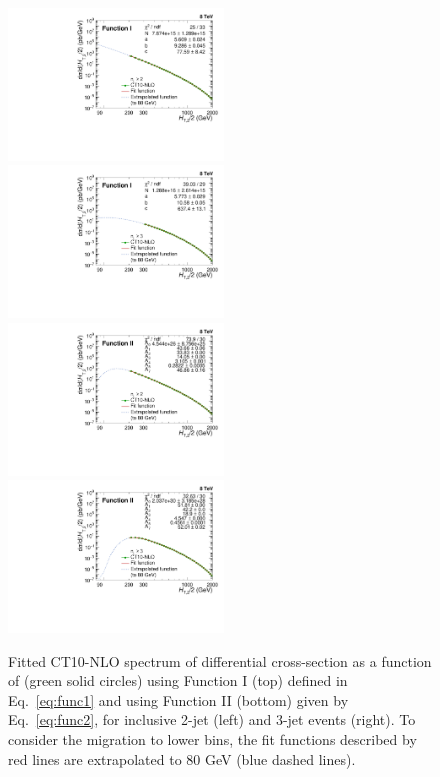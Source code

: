 \begin{figure}[ht]
  \begin{center}
    \hspace*{-5mm}\includegraphics[width=0.51\textwidth]{Plots_HT_2_150/Extrapolate_Theory_2_HT_2_150_funcI.pdf}%
    ~~\includegraphics[width=0.51\textwidth]{Plots_HT_2_150/Extrapolate_Theory_3_HT_2_150_funcI.pdf}\\
    \vspace{5mm}
    \hspace*{-5mm}\includegraphics[width=0.51\textwidth]{Plots_HT_2_150/Extrapolate_Theory_2_HT_2_150_funcII.pdf}%
    ~~\includegraphics[width=0.51\textwidth]{Plots_HT_2_150/Extrapolate_Theory_3_HT_2_150_funcII.pdf}
    \caption{Fitted CT10-NLO spectrum of differential cross-section as a function of \httwo (green solid circles) using Function I (top) defined in Eq.~\ref{eq:func1} and using Function II (bottom) given by Eq.~\ref{eq:func2}, for inclusive 2-jet (left) and 3-jet events (right). To consider the migration to lower \httwo bins, the fit functions described by red lines are extrapolated to 80 GeV (blue dashed lines).}
    \label{fig:fit}
  \end{center}
\end{figure}

